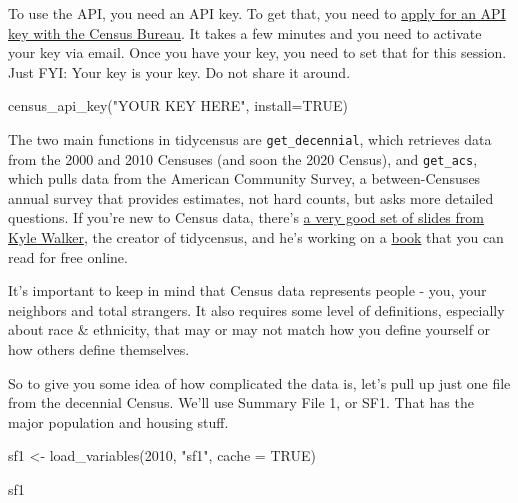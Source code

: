 \documentclass[
  letterpaper,
  DIV=11,
  numbers=noendperiod]{scrreprt}
\newenvironment{Shaded}{\begin{snugshade}}{\end{snugshade}}
\newcommand{\AttributeTok}[1]{\textcolor[rgb]{0.40,0.45,0.13}{#1}}
\newcommand{\ConstantTok}[1]{\textcolor[rgb]{0.56,0.35,0.01}{#1}}
\newcommand{\DecValTok}[1]{\textcolor[rgb]{0.68,0.00,0.00}{#1}}
\newcommand{\FunctionTok}[1]{\textcolor[rgb]{0.28,0.35,0.67}{#1}}
\newcommand{\NormalTok}[1]{\textcolor[rgb]{0.00,0.23,0.31}{#1}}
\newcommand{\OtherTok}[1]{\textcolor[rgb]{0.00,0.23,0.31}{#1}}
\newcommand{\StringTok}[1]{\textcolor[rgb]{0.13,0.47,0.30}{#1}}
\begin{document}
To use the API, you need an API key. To get that, you need to
\href{https://api.census.gov/data/key_signup.html}{apply for an API key
with the Census Bureau}. It takes a few minutes and you need to activate
your key via email. Once you have your key, you need to set that for
this session. Just FYI: Your key is your key. Do not share it around.

\begin{Shaded}
\begin{Highlighting}[]
\FunctionTok{census\_api\_key}\NormalTok{(}\StringTok{"YOUR KEY HERE"}\NormalTok{, }\AttributeTok{install=}\ConstantTok{TRUE}\NormalTok{)}
\end{Highlighting}
\end{Shaded}

The two main functions in tidycensus are \texttt{get\_decennial}, which
retrieves data from the 2000 and 2010 Censuses (and soon the 2020
Census), and \texttt{get\_acs}, which pulls data from the American
Community Survey, a between-Censuses annual survey that provides
estimates, not hard counts, but asks more detailed questions. If you're
new to Census data, there's
\href{http://walker-data.com/umich-workshop/census-data-in-r/slides/\#1}{a
very good set of slides from Kyle Walker}, the creator of tidycensus,
and he's working on a
\href{https://walker-data.com/census-r/index.html}{book} that you can
read for free online.

It's important to keep in mind that Census data represents people - you,
your neighbors and total strangers. It also requires some level of
definitions, especially about race \& ethnicity, that may or may not
match how you define yourself or how others define themselves.

So to give you some idea of how complicated the data is, let's pull up
just one file from the decennial Census. We'll use Summary File 1, or
SF1. That has the major population and housing stuff.

\begin{Shaded}
\begin{Highlighting}[]
\NormalTok{sf1 }\OtherTok{\textless{}{-}} \FunctionTok{load\_variables}\NormalTok{(}\DecValTok{2010}\NormalTok{, }\StringTok{"sf1"}\NormalTok{, }\AttributeTok{cache =} \ConstantTok{TRUE}\NormalTok{)}

\NormalTok{sf1}
\end{Highlighting}
\end{Shaded}
\end{document}
